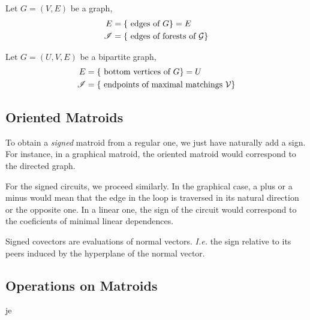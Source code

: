 \begin{definition}
    Let $G = (V, E)$ be a graph,
    \begin{equation*}
        \begin{split}
            E & = \lbrace \text{ edges of } G \rbrace = E \\
            \mathscr{I} & = \lbrace \text{ edges of forests of } \mathcal{G} \rbrace
        \end{split}
    \end{equation*}
\end{definition}

\begin{definition}
    Let $G = (U, V, E)$ be a bipartite graph,
    \begin{equation*}
        \begin{split}
            E & = \lbrace \text{ bottom vertices of } G \rbrace = U \\
            \mathscr{I} & = \lbrace \text{ endpoints of maximal matchings } \mathcal{V} \rbrace
        \end{split}
    \end{equation*}
\end{definition}

\subsection{Oriented Matroids}

To obtain a \textit{signed} matroid from a regular one, we just have naturally add a sign.
For instance, in a graphical matroid, the oriented matroid would correspond to the directed graph.

For the signed circuits, we proceed similarly.
In the graphical case, a plus or a minus would mean that the edge in the loop is traversed in its natural direction or the opposite one.
In a linear one, the sign of the circuit would correspond to the coeficients of minimal linear dependences.

\begin{definition}
    Signed covectors are evaluations of normal vectors.
    \textit{I.e.} the sign relative to its peers induced by the hyperplane of the normal vector.
\end{definition}

\subsection{Operations on Matroids}

je
